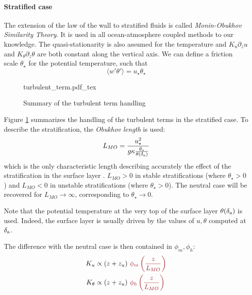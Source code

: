 \paragraph{Stratified case}
The extension of the law of the wall to stratified
fluids is called \textit{Monin-Obukhov Similarity Theory}.
It is used in all ocean-atmosphere coupled methods to our knowledge.
The quasi-stationarity is also assumed for the temperature
and $K_u \partial_z u$ and $K_\theta \partial_z \theta$
are both constant along the vertical axis.
We can define a friction scale $\theta_\star$
for the potential temperature, such that
\begin{equation}
	\langle w' \theta' \rangle = u_\star \theta_\star
\end{equation}
\begin{figure}[h!]
	\centering
	{turbulent_term.pdf_tex}
	\caption{Summary of the turbulent term handling}
	\label{fig:airseaSCM_turbulentTermHandling}
\end{figure}
Figure \ref{fig:airseaSCM_turbulentTermHandling} summarizes the
handling of the turbulent terms in the stratified case.
To describe the stratification, the \textit{Obukhov length}
is used:
\begin{equation}
	L_{MO} = \frac{u_\star^2}{g \kappa
	\frac{\theta_\star}{\theta(\delta_{\rm a})}}
\end{equation}
which is the only characteristic length describing
accurately the effect of the stratification in
the surface layer \citep{obukhov_turbulence_1946}.
$L_{MO}>0$ in stable stratifications
(where $\theta_\star>0$)
and $L_{MO}<0$ in unstable stratifications
(where $\theta_\star>0$).
The neutral case will be recovered
for $L_{MO} \rightarrow \infty$, corresponding
to $\theta_\star \rightarrow 0$.
\par
Note that the potential temperature at the very top of the surface
layer $\theta(\delta_{\rm a})$ is used. Indeed, the surface layer is
usually driven by the values of $u, \theta$
computed at $\delta_{\rm a}$.
\par
The difference with the neutral case is then contained
in  $\phi_m, \phi_h$:
\begin{equation}
\begin{aligned}
	K_u &\propto (z+z_u)~
	\emphase{\phi_m\left(\frac{z}{L_{MO}}\right)} \\
	K_\theta &\propto (z+z_u)~
	\emphase{\phi_h\left(\frac{z}{L_{MO}}\right)}
\end{aligned}
\end{equation}
